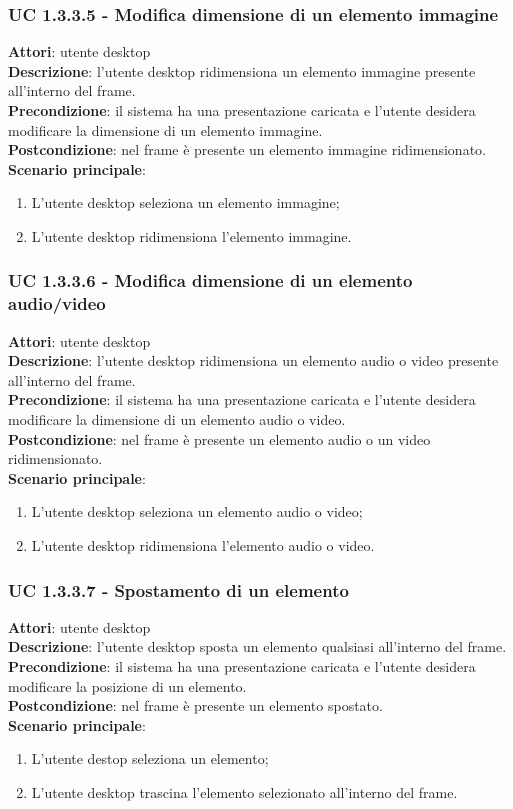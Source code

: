 \subsubsection{UC 1.3.3.5 - Modifica dimensione di un elemento immagine}{
	\label{uc1.3.3.5}
	\textbf{Attori}: utente desktop \\
	\textbf{Descrizione}: l'utente desktop ridimensiona un elemento immagine presente all'interno del frame. \\
	\textbf{Precondizione}: il sistema ha una presentazione caricata e l'utente desidera modificare la dimensione di un elemento immagine.	\\
	\textbf{Postcondizione}: nel frame è presente un elemento immagine ridimensionato.	\\
	\textbf{Scenario principale}:
	\begin{enumerate}
		\item L'utente desktop seleziona un elemento immagine;
		\item L'utente desktop ridimensiona l'elemento immagine.
	\end{enumerate}
	}
\subsubsection{UC 1.3.3.6 - Modifica dimensione di un elemento audio/video}{
	\label{uc1.3.3.6}
	\textbf{Attori}: utente desktop \\
	\textbf{Descrizione}: l'utente desktop ridimensiona un elemento audio o video presente all'interno del frame. \\
	\textbf{Precondizione}: il sistema ha una presentazione caricata e l'utente desidera modificare la dimensione di un elemento audio o video.	\\
	\textbf{Postcondizione}: nel frame è presente un elemento audio o un video ridimensionato.	\\
	\textbf{Scenario principale}:
	\begin{enumerate}
		\item L'utente desktop seleziona un elemento audio o video;
		\item L'utente desktop ridimensiona l'elemento audio o video.
	\end{enumerate}
	}
\subsubsection{UC 1.3.3.7 - Spostamento di un elemento}{
	\label{uc1.3.3.7}
	\textbf{Attori}: utente desktop \\
	\textbf{Descrizione}: l'utente desktop sposta un elemento qualsiasi all'interno del frame. \\
	\textbf{Precondizione}: il sistema ha una presentazione caricata e l'utente desidera modificare la posizione di un elemento.	\\
	\textbf{Postcondizione}: nel frame è presente un elemento spostato.	\\
	\textbf{Scenario principale}:
	\begin{enumerate}
		\item L'utente destop seleziona un elemento;
		\item L'utente desktop trascina l'elemento selezionato all'interno del frame.
	\end{enumerate}
	}
